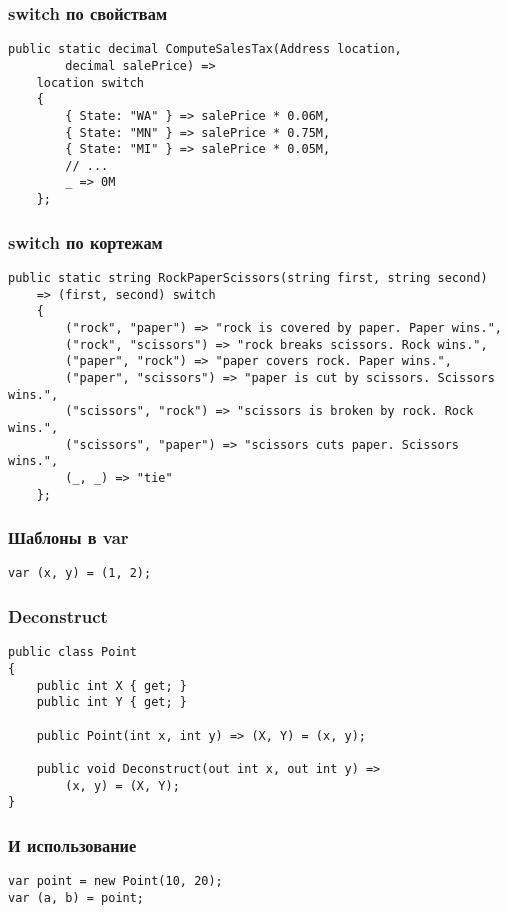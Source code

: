 \documentclass{../../slides-style}
\begin{document}
    \begin{frame}[fragile]
        \frametitle{switch по свойствам}
        \begin{verbatim}
public static decimal ComputeSalesTax(Address location, 
        decimal salePrice) =>
    location switch
    {
        { State: "WA" } => salePrice * 0.06M,
        { State: "MN" } => salePrice * 0.75M,
        { State: "MI" } => salePrice * 0.05M,
        // ...
        _ => 0M
    };
        \end{verbatim}
    \end{frame}

    \begin{frame}[fragile]
        \frametitle{switch по кортежам}
        \begin{verbatim}
public static string RockPaperScissors(string first, string second)
    => (first, second) switch
    {
        ("rock", "paper") => "rock is covered by paper. Paper wins.",
        ("rock", "scissors") => "rock breaks scissors. Rock wins.",
        ("paper", "rock") => "paper covers rock. Paper wins.",
        ("paper", "scissors") => "paper is cut by scissors. Scissors wins.",
        ("scissors", "rock") => "scissors is broken by rock. Rock wins.",
        ("scissors", "paper") => "scissors cuts paper. Scissors wins.",
        (_, _) => "tie"
    };
        \end{verbatim}
    \end{frame}

    \begin{frame}[fragile]
        \frametitle{Шаблоны в var}
        \begin{verbatim}
var (x, y) = (1, 2);
        \end{verbatim}
    \end{frame}

    \begin{frame}[fragile]
        \frametitle{Deconstruct}
        \begin{verbatim}
public class Point
{
    public int X { get; }
    public int Y { get; }

    public Point(int x, int y) => (X, Y) = (x, y);

    public void Deconstruct(out int x, out int y) =>
        (x, y) = (X, Y);
}
        \end{verbatim}
    \end{frame}

    \begin{frame}[fragile]
        \frametitle{И использование}
        \begin{verbatim}
var point = new Point(10, 20);
var (a, b) = point;
        \end{verbatim}
    \end{frame}
\end{document}
